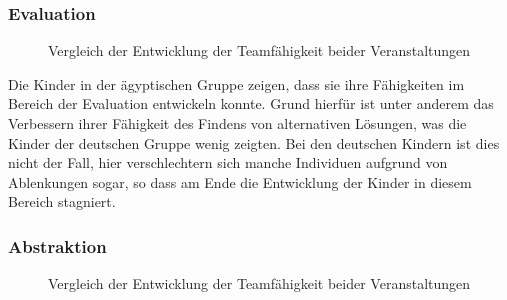 \subsubsection{Evaluation}
\begin{figure}[H]
	\centering
	\caption[Vergleich Entwicklung Teamfähigkeit beider Veranstaltungen]{Vergleich der Entwicklung der Teamfähigkeit beider Veranstaltungen}
\end{figure}

Die Kinder in der ägyptischen Gruppe zeigen, dass sie ihre Fähigkeiten im Bereich der Evaluation entwickeln konnte. Grund hierfür ist unter anderem das Verbessern ihrer Fähigkeit des Findens von alternativen Lösungen, was die Kinder der deutschen Gruppe wenig zeigten. Bei den deutschen Kindern ist dies nicht der Fall, hier verschlechtern sich manche Individuen aufgrund von Ablenkungen sogar, so dass am Ende die Entwicklung der Kinder in diesem Bereich stagniert.

\subsubsection{Abstraktion}
\begin{figure}[H]
	\centering
	\caption[Vergleich Entwicklung Teamfähigkeit beider Veranstaltungen]{Vergleich der Entwicklung der Teamfähigkeit beider Veranstaltungen}
	\label{img:comparingAbstraction}
\end{figure}

